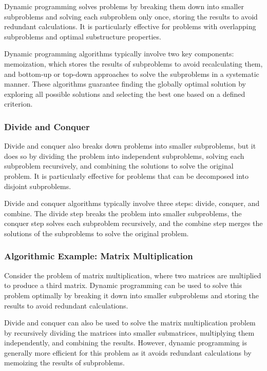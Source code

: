 \documentclass[12pt]{book} %
\begin{document}
Dynamic programming solves problems by breaking them down into smaller subproblems and solving each subproblem only once, storing the results to avoid redundant calculations. It is particularly effective for problems with overlapping subproblems and optimal substructure properties.

Dynamic programming algorithms typically involve two key components: memoization, which stores the results of subproblems to avoid recalculating them, and bottom-up or top-down approaches to solve the subproblems in a systematic manner. These algorithms guarantee finding the globally optimal solution by exploring all possible solutions and selecting the best one based on a defined criterion.

\subsubsection{Divide and Conquer}

Divide and conquer also breaks down problems into smaller subproblems, but it does so by dividing the problem into independent subproblems, solving each subproblem recursively, and combining the solutions to solve the original problem. It is particularly effective for problems that can be decomposed into disjoint subproblems.

Divide and conquer algorithms typically involve three steps: divide, conquer, and combine. The divide step breaks the problem into smaller subproblems, the conquer step solves each subproblem recursively, and the combine step merges the solutions of the subproblems to solve the original problem.

\subsubsection{Algorithmic Example: Matrix Multiplication}

Consider the problem of matrix multiplication, where two matrices are multiplied to produce a third matrix. Dynamic programming can be used to solve this problem optimally by breaking it down into smaller subproblems and storing the results to avoid redundant calculations.

Divide and conquer can also be used to solve the matrix multiplication problem by recursively dividing the matrices into smaller submatrices, multiplying them independently, and combining the results. However, dynamic programming is generally more efficient for this problem as it avoids redundant calculations by memoizing the results of subproblems.
\end{document}
